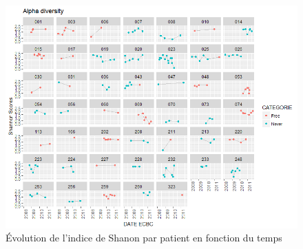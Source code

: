 \documentclass[12pt,a4paper]{article}
\begin{document}
\begin{figure}[H]
\begin{center}
\includegraphics[scale=0.8]{img/alpha_shannon.png}\hfill
\end{center}
\caption{Évolution de l'indice de Shanon par patient en fonction du temps}
\label{alphaShannon}
\end{figure}
\end{document}
